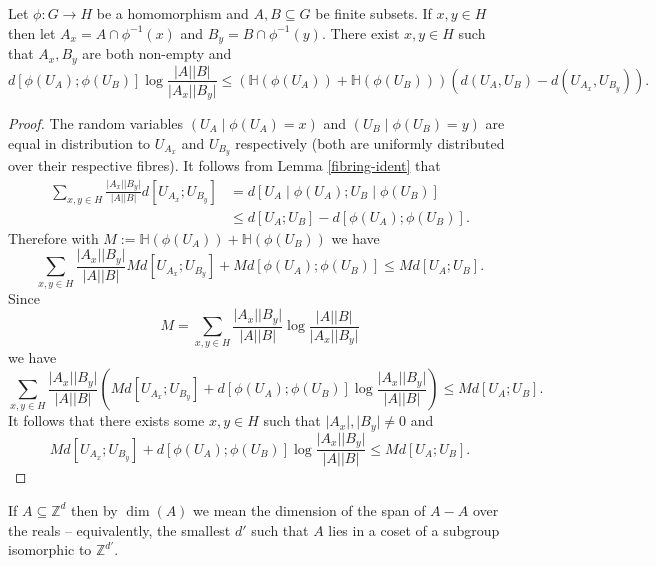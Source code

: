 \begin{lemma}\label{single-fibres}\leanok
Let $\phi:G\to H$ be a homomorphism and $A,B\subseteq G$ be finite subsets. If $x,y\in H$ then let $A_x=A\cap \phi^{-1}(x)$ and $B_y=B\cap \phi^{-1}(y)$. There exist $x,y\in H$ such that $A_x,B_y$ are both non-empty and
\[d[\phi(U_A);\phi(U_B)]\log \frac{\lvert A\rvert\lvert B\rvert}{\lvert A_x\rvert\lvert B_y\rvert}\leq (\mathbb{H}(\phi(U_A))+\mathbb{H}(\phi(U_B)))(d(U_A,U_B)-d(U_{A_x},U_{B_y})).\]
\end{lemma}
\begin{proof}
The random variables $(U_A\mid \phi(U_A)=x)$ and $(U_B\mid \phi(U_B)=y)$ are equal in distribution to $U_{A_x}$ and $U_{B_y}$ respectively (both are uniformly distributed over their respective fibres). It follows from Lemma \ref{fibring-ident} that
\begin{align*}
\sum_{x,y\in H}\frac{\lvert A_x\rvert\lvert B_y\rvert}{\lvert A\rvert\lvert B\rvert}d[U_{A_x};U_{B_y}]
&=d[U_A\mid \phi(U_A); U_B\mid \phi(U_B)]\\
&\leq d[U_A;U_B]-d[\phi(U_A);\phi(U_B)].
\end{align*}
Therefore with $M:=\mathbb{H}(\phi(U_A))+\mathbb{H}(\phi(U_B))$ we have
\[\sum_{x,y\in H}\frac{\lvert A_x\rvert\lvert B_y\rvert}{\lvert A\rvert\lvert B\rvert}Md[U_{A_x};U_{B_y}]+Md[\phi(U_A);\phi(U_B)]\leq Md[U_A;U_B].\]
Since
\[M=\sum_{x,y\in H}\frac{\lvert A_x\rvert\lvert B_y\rvert}{\lvert A\rvert\lvert B\rvert}\log \frac{\lvert A\rvert\lvert B\rvert}{\lvert A_x\rvert\lvert B_y\rvert}\]
we have
\[\sum_{x,y\in H} \frac{\lvert A_x\rvert\lvert B_y\rvert}{\lvert A\rvert\lvert B\rvert}\left(Md[U_{A_x};U_{B_y}]+d[\phi(U_A);\phi(U_B)]\log \frac{\lvert A_x\rvert\lvert B_y\rvert}{\lvert A\rvert\lvert B\rvert}\right)\leq  Md[U_A;U_B].\]
It follows that there exists some $x,y\in H$ such that $\lvert A_x\rvert,\lvert B_y\rvert\neq 0$ and
\[Md[U_{A_x};U_{B_y}]+d[\phi(U_A);\phi(U_B)]\log \frac{\lvert A_x\rvert\lvert B_y\rvert}{\lvert A\rvert\lvert B\rvert}\leq  Md[U_A;U_B].\]
\end{proof}


\begin{definition}\label{dimension-def}\leanok
If $A\subseteq \mathbb{Z}^{d}$ then by $\dim(A)$ we mean the dimension of the span of $A-A$ over the reals -- equivalently, the smallest $d'$ such that $A$ lies in a coset of a subgroup isomorphic to $\mathbb{Z}^{d'}$.
\end{definition}


